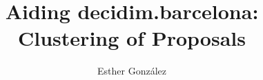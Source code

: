 \documentclass[a4paper,12pt,twoside]{report}
\begin{document}

\title{ Aiding decidim.barcelona: Clustering of 
Proposals}
\author{Esther González}

\maketitle

\maketitle

\restoregeometry

\preface
\cleardoublepage 


\body






\listoffigures
\newpage
\listoftables




% 
\end{document}
